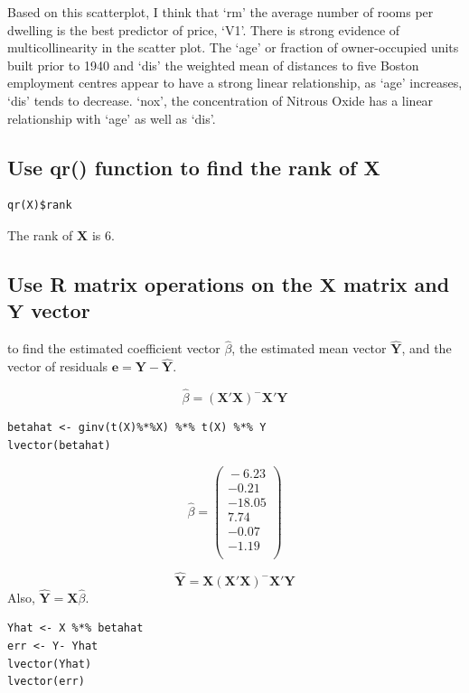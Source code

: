 \documentclass[11pt]{article}
\begin{document}
Based on this scatterplot, I think that `rm' the average number of
rooms per dwelling is the best predictor of price, `V1'. There is
strong evidence of multicollinearity in the scatter
plot. The ‘age’ or fraction of owner-occupied units built prior to
1940 and `dis' the weighted mean of distances to five Boston 
employment centres appear to have a strong linear relationship, as
`age' increases, `dis' tends to decrease. `nox', the concentration of
Nitrous Oxide has a linear relationship with `age' as well as `dis'.
\subsection{Use qr() function to find the rank of \textbf{X}}
\label{sec-4-2}



\begin{verbatim}
qr(X)$rank
\end{verbatim}

The rank of $\mathbf{X}$ is 6.
\subsection{Use R matrix operations on the $\mathbf{X}$ matrix and $\mathbf{Y}$ vector}
\label{sec-4-3}

to find the estimated coefficient vector $\hat{\beta}$, the estimated
mean vector $\hat{\mathbf{Y}}$, and the vector of residuals
$\mathbf{e} = \mathbf{Y} - \mathbf{\hat{Y}}$.

\[ \hat{\beta} = (\mathbf{X}'\mathbf{X})^{-}\mathbf{X}'\mathbf{Y} \]


\begin{verbatim}
betahat <- ginv(t(X)%*%X) %*% t(X) %*% Y
lvector(betahat)
\end{verbatim}

\[
\hat{\beta} =
\begin{pmatrix}{}
  -6.23 \\ 
  -0.21 \\ 
  -18.05 \\ 
  7.74 \\ 
  -0.07 \\ 
  -1.19 \\ 
  \end{pmatrix}
\]

\[ \hat{\mathbf{Y}} = \mathbf{X} (\mathbf{X}'\mathbf{X})^{-}\mathbf{X}'\mathbf{Y} \]
Also, $\hat{\mathbf{Y}} = \mathbf{X}\hat{\beta}$.


\begin{verbatim}
Yhat <- X %*% betahat
err <- Y- Yhat
lvector(Yhat)
lvector(err)
\end{verbatim}
\end{document}
